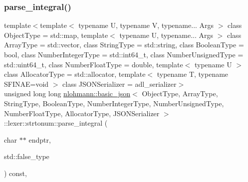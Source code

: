 \subsubsection{\texorpdfstring{parse\+\_\+integral()}{parse\_integral()}\hspace{0.1cm}{\footnotesize\ttfamily [2/2]}}
{\footnotesize\ttfamily template$<$template$<$ typename U, typename V, typename... Args $>$ class Object\+Type = std\+::map, template$<$ typename U, typename... Args $>$ class Array\+Type = std\+::vector, class String\+Type  = std\+::string, class Boolean\+Type  = bool, class Number\+Integer\+Type  = std\+::int64\+\_\+t, class Number\+Unsigned\+Type  = std\+::uint64\+\_\+t, class Number\+Float\+Type  = double, template$<$ typename U $>$ class Allocator\+Type = std\+::allocator, template$<$ typename T, typename S\+F\+I\+N\+A\+E=void $>$ class J\+S\+O\+N\+Serializer = adl\+\_\+serializer$>$ \\
unsigned long long \hyperlink{classnlohmann_1_1basic__json}{nlohmann\+::basic\+\_\+json}$<$ Object\+Type, Array\+Type, String\+Type, Boolean\+Type, Number\+Integer\+Type, Number\+Unsigned\+Type, Number\+Float\+Type, Allocator\+Type, J\+S\+O\+N\+Serializer $>$\+::lexer\+::strtonum\+::parse\+\_\+integral (\begin{DoxyParamCaption}\item[{char $\ast$$\ast$}]{endptr,  }\item[{std\+::false\+\_\+type}]{ }\end{DoxyParamCaption}) const\hspace{0.3cm}{\ttfamily [inline]}, {\ttfamily [private]}}

\mbox{\label{structnlohmann_1_1basic__json_1_1lexer_1_1strtonum_ad6996c1546ef27c8a241d2326dd46455}} 
